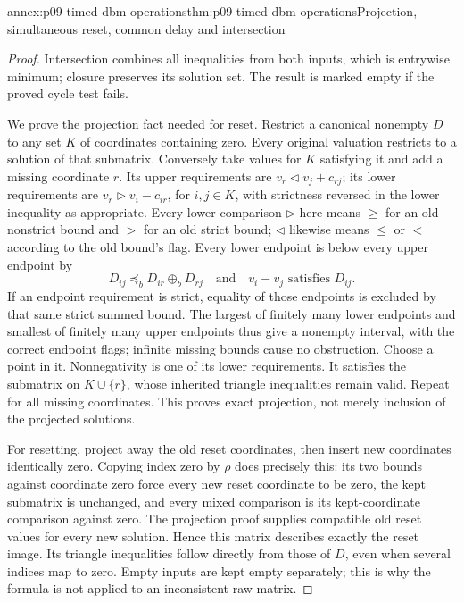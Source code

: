 \begin{annexitem}{annex:p09-timed-dbm-operations}{thm:p09-timed-dbm-operations}{Projection, simultaneous reset, common delay and intersection}
\begin{proof}
Intersection combines all inequalities from both inputs, which is
entrywise minimum; closure preserves its solution set. The result is
marked empty if the proved cycle test fails.

We prove the projection fact needed for reset. Restrict a canonical
nonempty \(D\) to any set \(K\) of coordinates containing zero. Every
original valuation restricts to a solution of that submatrix. Conversely
take values for \(K\) satisfying it and add a missing coordinate \(r\).
Its upper requirements are \(v_r\mathrel{\triangleleft}v_j+c_{rj}\);
its lower requirements are
\(v_r\mathrel{\triangleright}v_i-c_{ir}\), for \(i,j\in K\), with
strictness reversed in the lower inequality as appropriate. Every lower
comparison \(\triangleright\) here means \(\geq\) for an old nonstrict
bound and \(>\) for an old strict bound; \(\triangleleft\) likewise
means \(\leq\) or \(<\) according to the old bound's flag. Every lower
endpoint is below every upper endpoint by
\[
 D_{ij}\preceq_bD_{ir}\oplus_bD_{rj}
 \quad\text{and}\quad v_i-v_j\text{ satisfies }D_{ij}.
\]
If an endpoint requirement is strict, equality of those endpoints is
excluded by that same strict summed bound. The largest of finitely many
lower endpoints and smallest of finitely many upper endpoints thus give
a nonempty interval, with the correct endpoint flags; infinite missing
bounds cause no obstruction. Choose a point in it. Nonnegativity is
one of its lower requirements. It satisfies the submatrix on
\(K\cup\{r\}\), whose inherited triangle inequalities remain valid.
Repeat for all missing coordinates. This proves exact projection, not
merely inclusion of the projected solutions.

For resetting, project away the old reset coordinates, then insert new
coordinates identically zero. Copying index zero by \(\rho\) does
precisely this: its two bounds against coordinate zero force every new
reset coordinate to be zero, the kept submatrix is unchanged, and every
mixed comparison is its kept-coordinate comparison against zero. The
projection proof supplies compatible old reset values for every new
solution. Hence this matrix describes exactly the reset image. Its
triangle inequalities follow directly from those of \(D\), even when
several indices map to zero. Empty inputs are kept empty separately;
this is why the formula is not applied to an inconsistent raw matrix.


\end{proof}
\end{annexitem}
